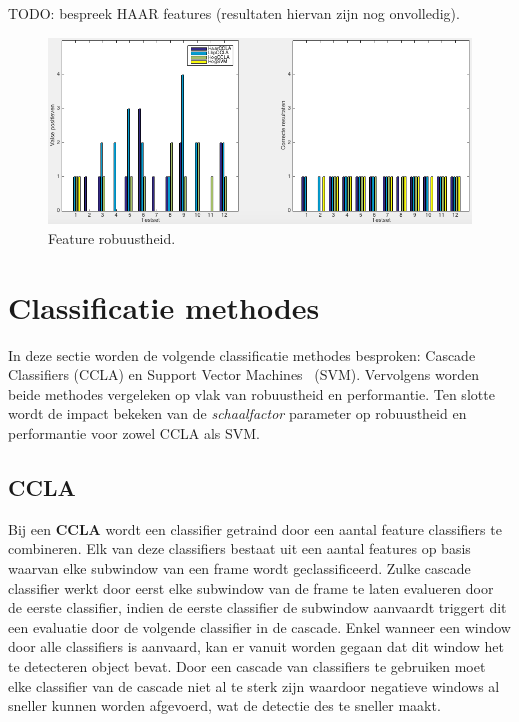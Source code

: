 TODO: bespreek HAAR features (resultaten hiervan zijn nog onvolledig). %


\begin{figure}
  \centering
  \includegraphics[width=\linewidth]{img/FeatRobust}
  \caption{Feature robuustheid.}
  \label{fig:featRobuust}
\end{figure}

\section{Classificatie methodes} \label{sec:class}
In deze sectie worden de volgende classificatie methodes besproken: Cascade Classifiers \cite{viola2001rapid} (CCLA) en Support Vector Machines~\cite{joachims1999svmlight} (SVM). Vervolgens worden beide methodes vergeleken op vlak van robuustheid en performantie. Ten slotte wordt de impact bekeken van de \textit{schaalfactor} parameter op robuustheid en performantie voor zowel CCLA als SVM.

\subsection{CCLA} \label{sec:class_ccla}
Bij een \textbf{CCLA} wordt een classifier getraind door een aantal feature classifiers te combineren. Elk van deze classifiers bestaat uit een aantal features op basis waarvan elke subwindow van een frame wordt geclassificeerd. Zulke cascade classifier werkt door eerst elke subwindow van de frame te laten evalueren door de eerste classifier, indien de eerste classifier de subwindow aanvaardt triggert dit een evaluatie door de volgende classifier in de cascade. Enkel wanneer een window door alle classifiers is aanvaard, kan er vanuit worden gegaan dat dit window het te detecteren object bevat. Door een cascade van classifiers te gebruiken moet elke classifier van de cascade niet al te sterk zijn waardoor negatieve windows al sneller kunnen worden afgevoerd, wat de detectie des te sneller maakt.

